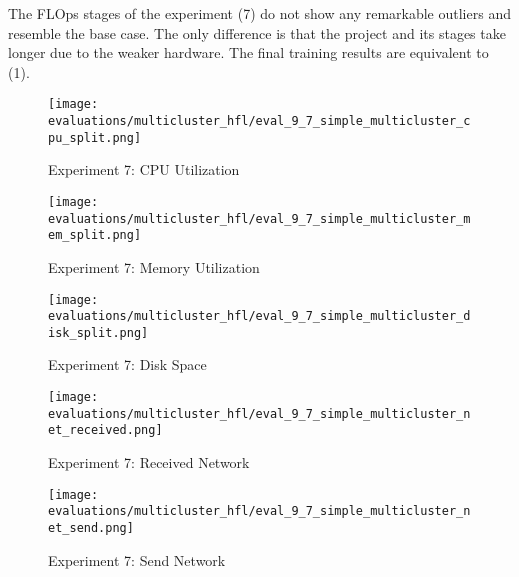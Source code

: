 The FLOps stages of the experiment (7) do not show any remarkable outliers and resemble the base case.
The only difference is that the project and its stages take longer due to the weaker hardware.
The final training results are equivalent to (1).

\begin{figure}[H]
    \begin{adjustwidth}{-0.2\paperwidth}{-0.2\paperwidth}
        \centering
        \texttt{[image: evaluations/multicluster\_hfl/eval\_9\_7\_simple\_multicluster\_cpu\_split.png]}
        \caption{Experiment 7: CPU Utilization}
        \label{fig:eval_7_cpu}
    \end{adjustwidth}
\end{figure}

\begin{figure}[p]
    \begin{adjustwidth}{-0.2\paperwidth}{-0.2\paperwidth}
        \centering
        \texttt{[image: evaluations/multicluster\_hfl/eval\_9\_7\_simple\_multicluster\_mem\_split.png]}
        \caption{Experiment 7: Memory Utilization}
        \label{fig:eval_7_mem}
    \end{adjustwidth}

    \begin{adjustwidth}{-0.2\paperwidth}{-0.2\paperwidth}
        \centering
        \texttt{[image: evaluations/multicluster\_hfl/eval\_9\_7\_simple\_multicluster\_disk\_split.png]}
        \caption{Experiment 7: Disk Space}
        \label{fig:eval_7_disk_space}
    \end{adjustwidth}
\end{figure}

\begin{figure}[p]
    \begin{adjustwidth}{-0.2\paperwidth}{-0.2\paperwidth}
        \centering
        \texttt{[image: evaluations/multicluster\_hfl/eval\_9\_7\_simple\_multicluster\_net\_received.png]}
        \caption{Experiment 7: Received Network}
        \label{fig:eval_7_net_received}
    \end{adjustwidth}

    \begin{adjustwidth}{-0.2\paperwidth}{-0.2\paperwidth}
        \centering
        \texttt{[image: evaluations/multicluster\_hfl/eval\_9\_7\_simple\_multicluster\_net\_send.png]}
        \caption{Experiment 7: Send Network}
        \label{fig:eval_7_net_send}
    \end{adjustwidth}
\end{figure}

